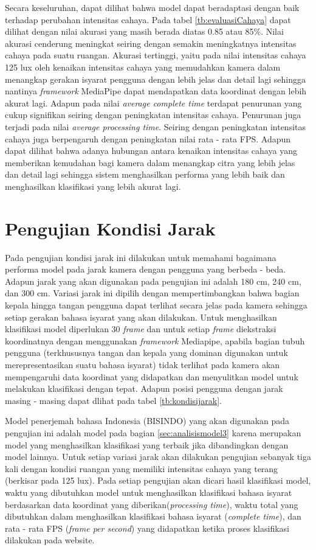 Secara keseluruhan, dapat dilihat bahwa model dapat beradaptasi dengan baik terhadap perubahan intensitas cahaya. Pada tabel \ref{tb:evaluasiCahaya} dapat dilihat dengan nilai akurasi yang masih berada diatas 0.85 atau 85\%. Nilai akurasi cenderung meningkat seiring dengan semakin meningkatnya intensitas cahaya pada suatu ruangan. Akurasi tertinggi, yaitu pada nilai intensitas cahaya 125 lux oleh kenaikan intensitas cahaya yang memudahkan kamera dalam menangkap gerakan isyarat pengguna dengan lebih jelas dan detail lagi sehingga nantinya \emph{framework} MediaPipe dapat mendapatkan data koordinat dengan lebih akurat lagi. Adapun pada nilai \emph{average complete time} terdapat penurunan yang cukup signifikan seiring dengan peningkatan intensitas cahaya. Penurunan juga terjadi pada nilai \emph{average processing time}. Seiring dengan peningkatan intensitas cahaya juga berpengaruh dengan peningkatan nilai rata - rata FPS. Adapun dapat dilihat bahwa adanya hubungan antara kenaikan intensitas cahaya yang memberikan kemudahan bagi kamera dalam menangkap citra yang lebih jelas dan detail lagi sehingga sistem menghasilkan performa yang lebih baik dan menghasilkan klasifikasi yang lebih akurat lagi.

\section{Pengujian Kondisi Jarak}
\label{sec:analisisjarak}

Pada pengujian kondisi jarak ini dilakukan untuk memahami bagaimana performa model pada jarak kamera dengan pengguna yang berbeda - beda. Adapun jarak yang akan digunakan pada pengujian ini adalah 180 cm, 240 cm, dan 300 cm. Variasi jarak ini dipilih dengan mempertimbangkan bahwa bagian kepala hingga tangan pengguna dapat terlihat secara jelas pada kamera sehingga setiap gerakan bahasa isyarat yang akan dilakukan. Untuk menghasilkan klasifikasi model diperlukan 30 \emph{frame} dan untuk setiap \emph{frame} diekstraksi koordinatnya dengan menggunakan \emph{framework} Mediapipe, apabila bagian tubuh pengguna (terkhususnya tangan dan kepala yang dominan digunakan untuk merepresentasikan suatu bahasa isyarat) tidak terlihat pada kamera akan mempengaruhi data koordinat yang didapatkan dan menyulitkan model untuk melakukan klasifikasi dengan tepat. Adapun posisi pengguna dengan jarak masing - masing dapat dlihat pada tabel \ref{tb:kondisijarak}. 

Model penerjemah bahasa Indonesia (BISINDO) yang akan digunakan pada pengujian ini adalah model pada bagian \ref{sec:analisismodel3} karena merupakan model yang menghasilkan klasifikasi yang terbaik jika dibandingkan dengan model lainnya. Untuk setiap variasi jarak akan dilakukan pengujian sebanyak tiga kali dengan kondisi ruangan yang memiliki intensitas cahaya yang terang (berkisar pada 125 lux). Pada setiap pengujian akan dicari hasil klasifikasi model, waktu yang dibutuhkan model untuk menghasilkan klasifikasi bahasa isyarat berdasarkan data koordinat yang diberikan(\emph{processing time}), waktu total yang dibutuhkan dalam menghasilkan klasifikasi bahasa isyarat (\emph{complete time}), dan rata - rata FPS (\emph{frame per second}) yang didapatkan ketika proses klasifikasi dilakukan pada website. 

